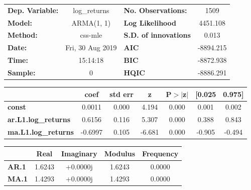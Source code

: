 \begin{center}
\begin{tabular}{lclc}
\toprule
\textbf{Dep. Variable:}     &        log\_returns       & \textbf{  No. Observations:  } &            1509            \\
\textbf{Model:}             &         ARMA(1, 1)        & \textbf{  Log Likelihood     } &          4451.108          \\
\textbf{Method:}            &          css-mle          & \textbf{  S.D. of innovations} &           0.013            \\
\textbf{Date:}              &      Fri, 30 Aug 2019     & \textbf{  AIC                } &         -8894.215          \\
\textbf{Time:}              &          15:14:18         & \textbf{  BIC                } &         -8872.938          \\
\textbf{Sample:}            &             0             & \textbf{  HQIC               } &         -8886.291          \\
\bottomrule
\end{tabular}
\begin{tabular}{lcccccc}
                            & \textbf{coef} & \textbf{std err} & \textbf{z} & \textbf{P$> |$z$|$} & \textbf{[0.025} & \textbf{0.975]}  \\
\midrule
\textbf{const}              &       0.0011  &        0.000     &     4.194  &         0.000        &        0.001    &        0.002     \\
\textbf{ar.L1.log\_returns} &       0.6156  &        0.116     &     5.307  &         0.000        &        0.388    &        0.843     \\
\textbf{ma.L1.log\_returns} &      -0.6997  &        0.105     &    -6.681  &         0.000        &       -0.905    &       -0.494     \\
\bottomrule
\end{tabular}
\begin{tabular}{lcccc}
              & \textbf{            Real} & \textbf{         Imaginary} & \textbf{         Modulus} & \textbf{        Frequency}  \\
\midrule
\textbf{AR.1} &                1.6243     &                +0.0000j     &                1.6243     &                0.0000       \\
\textbf{MA.1} &                1.4293     &                +0.0000j     &                1.4293     &                0.0000       \\
\bottomrule
\end{tabular}
\end{center}
